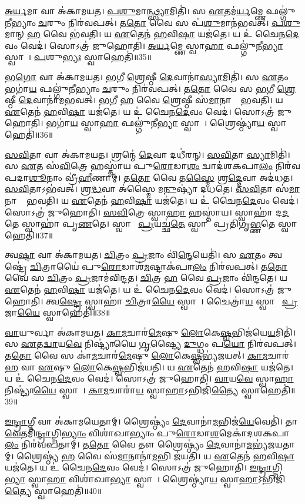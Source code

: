 \ul{𑌅}\ul{𑌰𑍍𑌯}𑌮𑌾 𑌵𑌾 𑌅॑𑌕𑌾𑌮𑌯𑌤।
\ul{𑌪}\ul{𑌶𑍁}𑌮𑌾\ul{𑌨𑍍𑌥𑍍𑌸𑍍𑌯𑌾}𑌮𑌿𑌤𑌿॑।
𑌸 \ul{𑌏}𑌤𑌮॑\ul{𑌰𑍍𑌯}𑌮𑍍𑌣𑍇 𑌫𑌲𑍍𑌗𑍁॑𑌨𑍀𑌭𑍍𑌯𑌾𑌂 \ul{𑌚}𑌰𑍁𑌂 𑌨𑌿𑌰॑𑌵𑌪𑌤𑍍।
𑌤\ul{𑌤𑍋} 𑌵𑍈 𑌸 𑌪॑\ul{𑌶𑍁}𑌮𑌾𑌨॑𑌭𑌵𑌤𑍍।
\ul{𑌪}\ul{𑌶𑍁}𑌮𑌾𑌨𑍍 \ul{𑌹} 𑌵𑍈 𑌭॑𑌵𑌤𑌿।
𑌯 \ul{𑌏}𑌤𑍇𑌨॑ \ul{𑌹}𑌵𑌿\ul{𑌷𑌾} 𑌯𑌜॑𑌤𑍇।
𑌯 𑌉॑ 𑌚𑍈𑌨\ul{𑌦𑍇}𑌵𑌂 𑌵𑍇𑌦॑।
𑌸𑍋𑌽𑌤𑍍𑌰॑ 𑌜𑍁𑌹𑍋𑌤𑌿।
\ul{𑌅}\ul{𑌰𑍍𑌯}𑌮𑍍𑌣𑍇 𑌸𑍍𑌵𑌾\ul{𑌹𑌾} 𑌫𑌲𑍍𑌗𑍁॑𑌨𑍀\ul{𑌭𑍍𑌯𑌾}\ul{} 𑌸𑍍𑌵𑌾𑌹𑌾᳚।
\ul{𑌪}𑌶𑍁\ul{𑌭𑍍𑌯𑌃} 𑌸𑍍𑌵𑌾𑌹𑍇𑌤𑌿॑॥35॥

𑌭\ul{𑌗𑍋} 𑌵𑌾 𑌅॑𑌕𑌾𑌮𑌯𑌤।
\ul{𑌭}𑌗𑍀 \ul{𑌶𑍍𑌰𑍇}𑌷𑍍𑌠𑍀 \ul{𑌦𑍇}𑌵𑌾𑌨𑌾॑\ul{𑌸𑍍𑌯𑌾}𑌮𑌿𑌤𑌿॑।
𑌸 \ul{𑌏}𑌤𑌂 𑌭𑌗𑌾॑\ul{𑌯} 𑌫𑌲𑍍𑌗𑍁॑𑌨𑍀𑌭𑍍𑌯𑌾𑌂 \ul{𑌚}𑌰𑍁𑌂 𑌨𑌿𑌰॑𑌵𑌪𑌤𑍍।
𑌤\ul{𑌤𑍋} 𑌵𑍈 𑌸 \ul{𑌭}𑌗𑍀 \ul{𑌶𑍍𑌰𑍇}𑌷𑍍𑌠𑍀 \ul{𑌦𑍇}𑌵𑌾𑌨𑌾॑𑌮𑌭𑌵𑌤𑍍।
\ul{𑌭}𑌗𑍀 \ul{𑌹} 𑌵𑍈 \ul{𑌶𑍍𑌰𑍇}𑌷𑍍𑌠𑍀 𑌸॑\ul{𑌮𑌾}𑌨𑌾𑌨𑌾𑌂᳚ 𑌭𑌵𑌤𑌿।
𑌯 \ul{𑌏}𑌤𑍇𑌨॑ \ul{𑌹}𑌵𑌿\ul{𑌷𑌾} 𑌯𑌜॑𑌤𑍇।
𑌯 𑌉॑ 𑌚𑍈𑌨\ul{𑌦𑍇}𑌵𑌂 𑌵𑍇𑌦॑।
𑌸𑍋𑌽𑌤𑍍𑌰॑ 𑌜𑍁𑌹𑍋𑌤𑌿।
𑌭𑌗𑌾॑\ul{𑌯} 𑌸𑍍𑌵𑌾\ul{𑌹𑌾} 𑌫𑌲𑍍𑌗𑍁॑𑌨𑍀\ul{𑌭𑍍𑌯𑌾}\ul{} 𑌸𑍍𑌵𑌾𑌹𑌾᳚।
𑌶𑍍𑌰𑍈𑌷𑍍𑌠𑍍𑌯𑌾॑\ul{𑌯} 𑌸𑍍𑌵𑌾𑌹𑍇𑌤𑌿॑॥36॥

\ul{𑌸}\ul{𑌵𑌿}𑌤𑌾 𑌵𑌾 𑌅॑𑌕𑌾𑌮𑌯𑌤।
𑌶𑍍𑌰𑌨𑍍𑌮𑍇॑ \ul{𑌦𑍇}𑌵𑌾 𑌦𑌧𑍀॑𑌰𑌨𑍍।
\ul{𑌸}\ul{𑌵𑌿}𑌤𑌾 \ul{𑌸𑍍𑌯𑌾}𑌮𑌿𑌤𑌿॑।
𑌸 \ul{𑌏}𑌤 𑌸॑\ul{𑌵𑌿}𑌤𑍍𑌰𑍇 𑌹𑌸𑍍𑌤𑌾॑𑌯 𑌪𑍁\ul{𑌰𑍋}𑌡𑌾\ul{𑌶𑌂} 𑌦𑍍𑌵𑌾𑌦॑𑌶𑌕𑌪𑌾\ul{𑌲𑌂} 𑌨𑌿𑌰॑𑌵𑌪𑌦𑌾\ul{𑌶𑍂}𑌨𑌾𑌂 𑌵𑍍𑌰𑍀॑\ul{𑌹𑍀}𑌣𑌾𑌮𑍍।
𑌤\ul{𑌤𑍋} 𑌵𑍈 𑌤\ul{𑌸𑍍𑌮𑍈} 𑌶𑍍𑌰\ul{𑌦𑍍𑌦𑍇}𑌵𑌾 𑌅𑌦॑𑌧𑌤।
\ul{𑌸}\ul{𑌵𑌿}𑌤𑌾\-𑌽𑌭॑𑌵𑌤𑍍।
𑌶𑍍𑌰\ul{𑌦𑍍𑌧}𑌵𑌾 𑌅॑𑌸𑍍𑌮𑍈 𑌮\ul{𑌨𑍁}𑌷𑍍𑌯𑌾॑ 𑌦𑌧𑌤𑍇।
\ul{𑌸}\ul{𑌵𑌿}𑌤𑌾 𑌸॑\ul{𑌮𑌾}𑌨𑌾𑌨𑌾𑌂᳚ 𑌭𑌵𑌤𑌿।
𑌯 \ul{𑌏}𑌤𑍇𑌨॑ \ul{𑌹}𑌵𑌿\ul{𑌷𑌾} 𑌯𑌜॑𑌤𑍇।
𑌯 𑌉॑ 𑌚𑍈𑌨\ul{𑌦𑍇}𑌵𑌂 𑌵𑍇𑌦॑।
𑌸𑍋𑌽𑌤𑍍𑌰॑ 𑌜𑍁𑌹𑍋𑌤𑌿।
\ul{𑌸}\ul{𑌵𑌿}𑌤𑍍𑌰𑍇 𑌸𑍍𑌵𑌾\ul{𑌹𑌾} 𑌹𑌸𑍍𑌤𑌾॑𑌯।
𑌸𑍍𑌵𑌾𑌹𑌾॑ 𑌦\ul{𑌦}𑌤𑍇 𑌸𑍍𑌵𑌾𑌹𑌾॑ 𑌪𑍃\ul{𑌣}𑌤𑍇।
𑌸𑍍𑌵𑌾𑌹𑌾᳚ \ul{𑌪𑍍𑌰}𑌯𑌚𑍍𑌛॑\ul{𑌤𑍇} 𑌸𑍍𑌵𑌾𑌹𑌾᳚ 𑌪𑍍𑌰𑌤𑌿𑌗𑍃\ul{𑌭𑍍𑌣}𑌤𑍇 𑌸𑍍𑌵𑌾𑌹𑍇𑌤𑌿॑॥37॥

𑌤𑍍𑌵\ul{𑌷𑍍𑌟𑌾} 𑌵𑌾 𑌅॑𑌕𑌾𑌮𑌯𑌤।
\ul{𑌚𑌿}𑌤𑍍𑌰𑌂 \ul{𑌪𑍍𑌰}𑌜𑌾𑌂 𑌵𑌿॑\ul{𑌨𑍍𑌦𑍇}𑌯𑍇𑌤𑌿॑।
𑌸 \ul{𑌏}𑌤𑌂 𑌤𑍍𑌵𑌷𑍍𑌟𑍍𑌰𑍇॑ \ul{𑌚𑌿}𑌤𑍍𑌰𑌾𑌯𑍈॑ 𑌪𑍁\ul{𑌰𑍋}𑌡𑌾𑌶॑\ul{𑌮}𑌷𑍍𑌟𑌾𑌕॑𑌪𑌾\ul{𑌲𑌂} 𑌨𑌿𑌰॑𑌵𑌪𑌤𑍍।
𑌤\ul{𑌤𑍋} 𑌵𑍈 𑌸 \ul{𑌚𑌿}𑌤𑍍𑌰𑌂 \ul{𑌪𑍍𑌰}𑌜𑌾𑌮॑𑌵𑌿𑌨𑍍𑌦𑌤।
\ul{𑌚𑌿}𑌤𑍍𑌰 \ul{𑌹} 𑌵𑍈 \ul{𑌪𑍍𑌰}𑌜𑌾𑌂 𑌵𑌿॑𑌨𑍍𑌦𑌤𑍇।
𑌯 \ul{𑌏}𑌤𑍇𑌨॑ \ul{𑌹}𑌵𑌿\ul{𑌷𑌾} 𑌯𑌜॑𑌤𑍇।
𑌯 𑌉॑ 𑌚𑍈𑌨\ul{𑌦𑍇}𑌵𑌂 𑌵𑍇𑌦॑।
𑌸𑍋𑌽𑌤𑍍𑌰॑ 𑌜𑍁𑌹𑍋𑌤𑌿।
𑌤𑍍𑌵\ul{𑌷𑍍𑌟𑍍𑌰𑍇} 𑌸𑍍𑌵𑌾𑌹𑌾॑ \ul{𑌚𑌿}𑌤𑍍𑌰𑌾\ul{𑌯𑍈} 𑌸𑍍𑌵𑌾𑌹𑌾᳚।
𑌚𑍈𑌤𑍍𑌰𑌾॑\ul{𑌯} 𑌸𑍍𑌵𑌾𑌹𑌾᳚ \ul{𑌪𑍍𑌰}𑌜𑌾\ul{𑌯𑍈} 𑌸𑍍𑌵𑌾𑌹𑍇𑌤𑌿॑॥38॥

\ul{𑌵𑌾}𑌯𑍁𑌰𑍍𑌵𑌾 𑌅॑𑌕𑌾𑌮𑌯𑌤।
\ul{𑌕𑌾}\ul{𑌮}𑌚𑌾𑌰॑\ul{𑌮𑍇}𑌷𑍁 \ul{𑌲𑍋}𑌕𑍇\ul{𑌷𑍍𑌵}𑌭𑌿𑌜॑𑌯𑍇\ul{𑌯}𑌮𑌿𑌤𑌿॑।
𑌸 \ul{𑌏}𑌤\ul{𑌦𑍍𑌵𑌾}𑌯\ul{𑌵𑍇} 𑌨𑌿𑌷𑍍𑌟𑍍𑌯𑌾॑𑌯𑍈 \ul{𑌗𑍃}𑌷𑍍𑌟𑍍𑌯𑍈 \ul{𑌦𑍁}𑌗𑍍𑌧𑌂 𑌪\ul{𑌯𑍋} 𑌨𑌿𑌰॑𑌵𑌪𑌤𑍍।
𑌤\ul{𑌤𑍋} 𑌵𑍈 𑌸 𑌕𑌾॑\ul{𑌮}𑌚𑌾𑌰॑\ul{𑌮𑍇}𑌷𑍁 \ul{𑌲𑍋}𑌕𑍇\ul{𑌷𑍍𑌵}𑌭𑍍𑌯॑𑌜𑌯𑌤𑍍।
\ul{𑌕𑌾}\ul{𑌮}𑌚𑌾𑌰॑ \ul{𑌹} 𑌵𑌾 \ul{𑌏}𑌷𑍁 \ul{𑌲𑍋}𑌕𑍇\ul{𑌷𑍍𑌵}𑌭𑌿𑌜॑𑌯𑌤𑌿।
𑌯 \ul{𑌏}𑌤𑍇𑌨॑ \ul{𑌹}𑌵𑌿\ul{𑌷𑌾} 𑌯𑌜॑𑌤𑍇।
𑌯 𑌉॑ 𑌚𑍈𑌨\ul{𑌦𑍇}𑌵𑌂 𑌵𑍇𑌦॑।
𑌸𑍋𑌽𑌤𑍍𑌰॑ 𑌜𑍁𑌹𑍋𑌤𑌿।
\ul{𑌵𑌾}𑌯\ul{𑌵𑍇} 𑌸𑍍𑌵𑌾\ul{𑌹𑌾} 𑌨𑌿𑌷𑍍𑌟𑍍𑌯𑌾॑\ul{𑌯𑍈} 𑌸𑍍𑌵𑌾𑌹𑌾᳚।
\ul{𑌕𑌾}\ul{𑌮}𑌚𑌾𑌰𑌾॑\ul{𑌯} 𑌸𑍍𑌵𑌾\ul{𑌹𑌾}\-𑌽𑌭𑌿𑌜𑌿॑\ul{𑌤𑍍𑌯𑍈} 𑌸𑍍𑌵𑌾𑌹𑍇𑌤𑌿॑॥39॥

\ul{𑌇}\ul{𑌨𑍍𑌦𑍍𑌰𑌾}𑌗𑍍𑌨𑍀 𑌵𑌾 𑌅॑𑌕𑌾𑌮𑌯𑍇𑌤𑌾𑌮𑍍।
𑌶𑍍𑌰𑍈𑌷𑍍𑌠𑍍𑌯𑌂॑ \ul{𑌦𑍇}𑌵𑌾𑌨𑌾॑\ul{𑌮}𑌭𑌿𑌜॑\ul{𑌯𑍇}𑌵𑍇𑌤𑌿॑।
𑌤𑌾\ul{𑌵𑍇}𑌤𑌮𑌿॑\ul{𑌨𑍍𑌦𑍍𑌰𑌾}𑌗𑍍𑌨𑌿\ul{𑌭𑍍𑌯𑌾𑌂} 𑌵𑌿𑌶𑌾॑𑌖𑌾𑌭𑍍𑌯𑌾𑌂 𑌪𑍁\ul{𑌰𑍋}𑌡𑌾\ul{𑌶}𑌮𑍇𑌕𑌾॑𑌦𑌶𑌕𑌪𑌾\ul{𑌲𑌂} 𑌨𑌿𑌰॑𑌵𑌪𑌤𑌾𑌮𑍍।
𑌤\ul{𑌤𑍋} 𑌵𑍈 𑌤𑍗 𑌶𑍍𑌰𑍈𑌷𑍍𑌠𑍍𑌯𑌂॑ \ul{𑌦𑍇}𑌵𑌾𑌨𑌾॑\ul{𑌮}𑌭𑍍𑌯॑𑌜𑌯𑌤𑌾𑌮𑍍।
𑌶𑍍𑌰𑍈𑌷𑍍𑌠𑍍𑌯॑ \ul{𑌹} 𑌵𑍈 𑌸॑\ul{𑌮𑌾}𑌨𑌾𑌨𑌾॑\ul{𑌮}𑌭𑌿 𑌜॑𑌯𑌤𑌿।
𑌯 \ul{𑌏}𑌤𑍇𑌨॑ \ul{𑌹}𑌵𑌿\ul{𑌷𑌾} 𑌯𑌜॑𑌤𑍇।
𑌯 𑌉॑ 𑌚𑍈𑌨\ul{𑌦𑍇}𑌵𑌂 𑌵𑍇𑌦॑।
𑌸𑍋𑌽𑌤𑍍𑌰॑ 𑌜𑍁𑌹𑍋𑌤𑌿।
\ul{𑌇}\ul{𑌨𑍍𑌦𑍍𑌰𑌾}𑌗𑍍𑌨𑌿\ul{𑌭𑍍𑌯𑌾}\ul{} 𑌸𑍍𑌵𑌾\ul{𑌹𑌾} 𑌵𑌿𑌶𑌾॑𑌖𑌾\ul{𑌭𑍍𑌯𑌾}\ul{} 𑌸𑍍𑌵𑌾𑌹𑌾᳚।
𑌶𑍍𑌰𑍈𑌷𑍍𑌠𑍍𑌯𑌾॑\ul{𑌯} 𑌸𑍍𑌵𑌾\ul{𑌹𑌾}\-𑌽𑌭𑌿𑌜𑌿॑\ul{𑌤𑍍𑌯𑍈} 𑌸𑍍𑌵𑌾𑌹𑍇𑌤𑌿॑॥40॥

